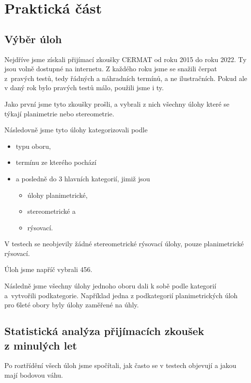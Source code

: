 \chapter{Praktická část}


\section{Výběr úloh}

Nejdříve jsme získali přijímací zkoušky CERMAT od roku 2015 do roku 2022. Ty jsou volně dostupné na internetu. Z každého roku jsme se snažili čerpat z~pravých testů, tedy řádných a náhradních termínů, a ne ilustračních. Pokud ale v daný rok bylo pravých testů málo, použili jsme i ty.

Jako první jsme tyto zkoušky prošli, a vybrali z nich všechny úlohy které se týkají planimetrie nebo stereometrie.

Následovně jsme tyto úlohy kategorizovali podle
\begin{itemize}
    \item typu oboru,
    \item termínu ze kterého pochází
    \item a posledně do 3 hlavních kategorií, jimiž jsou
    \begin{itemize}
        \item úlohy planimetrické,
        \item stereometrické a
        \item rýsovací.
    \end{itemize}
\end{itemize}

V testech se neobjevily žádné stereometrické rýsovací úlohy, pouze planimetrické rýsovací.

Úloh jsme napříč vybrali 456.

Následně jsme všechny úlohy jednoho oboru dali k sobě podle kategorií a~vytvořili podkategorie. Například jedna z podkategorií planimetrických úloh pro 6leté obory byly úlohy zaměřené na úhly.


\section[Statistická analýza přijímacích zkoušek z minulých let]{Statistická analýza přijímacích zkoušek\\z minulých let}

Po roztřídění všech úloh jsme spočítali, jak často se v testech objevují a jakou mají bodovou váhu.


